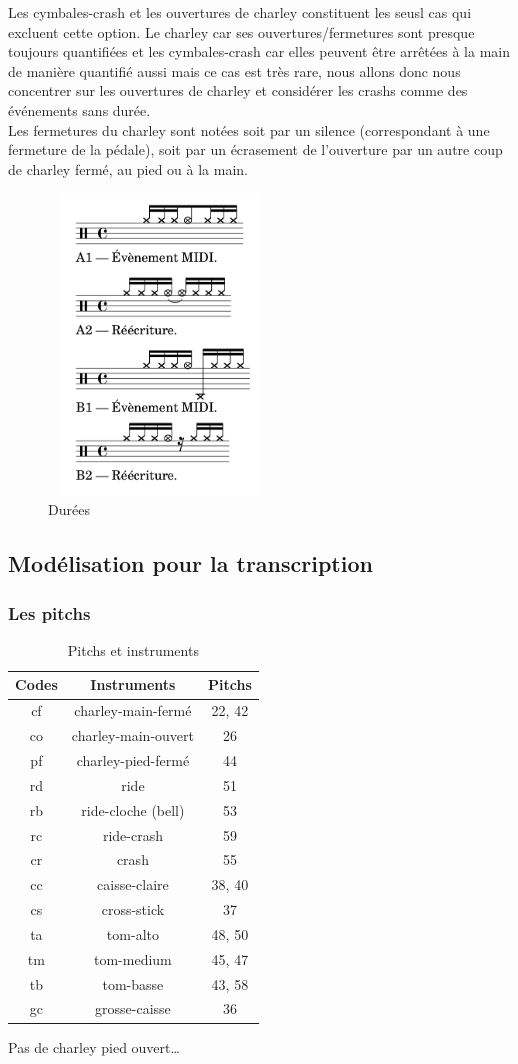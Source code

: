 Les cymbales-crash et les ouvertures de charley constituent les seusl cas qui excluent cette option. Le charley car ses ouvertures/fermetures sont presque toujours quantifiées et les cymbales-crash car elles peuvent être arrêtées à la main de manière quantifié aussi mais ce cas est très rare, nous allons donc nous concentrer sur les ouvertures de charley et considérer les crashs comme des événements sans durée.\\
Les fermetures du charley sont notées soit par un silence (correspondant à une fermeture de la pédale), soit par un écrasement de l’ouverture par un autre coup de charley fermé, au pied ou à la main.
\begin{figure}[h]
	\includegraphics[height=80mm, width=60mm]{z_images/reecriture/exemples_charley_1.png}
	\caption{Durées}
\end{figure} 
\subsection{Modélisation pour la transcription}
\subsubsection{Les pitchs}
\begin{table}[h]
	\centering
	\begin{tabular}{|c|c|c|} \hline
		Codes & Instruments & Pitchs \\ \hline
		cf & charley-main-fermé & 22, 42 \\
		co & charley-main-ouvert & 26 \\
		pf & charley-pied-fermé & 44 \\
		rd & ride & 51 \\
		rb & ride-cloche (bell) & 53 \\
		rc & ride-crash & 59 \\
		cr & crash & 55 \\
		cc & caisse-claire & 38, 40 \\
		cs & cross-stick & 37 \\
		ta & tom-alto & 48, 50 \\
		tm & tom-medium & 45, 47 \\
		tb & tom-basse & 43, 58 \\
		gc & grosse-caisse & 36 \\ \hline
	\end{tabular}
	\caption{Pitchs et instruments}
\end{table}
Pas de charley pied ouvert…
